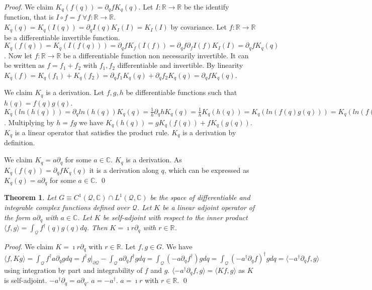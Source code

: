 \documentclass[smallextended]{svjour3}
\numberwithin{equation}{section}
\renewenvironment{proof}{\emph{Proof}.}{\hfill\(\qed\)}
\newtheorem{thrm}[equation]{Theorem}
\theoremstyle{definition}
\renewenvironment{proof}{\emph{Proof}.}{\qed}
\begin{document}
\begin{proof}
	We claim $K_q(f(q))= \partial_q f K_q(q)$. Let $I : \mathbb{R} \rightarrow \mathbb{R}$ be the identify function, that is $I \circ f = f \; \forall f : \mathbb{R} \rightarrow \mathbb{R}$. $K_q(q) = K_q(I(q)) = \partial_q I(q) K_{I}(I) = K_{I}(I)$ by covariance.
	Let $f : \mathbb{R} \rightarrow \mathbb{R}$ be a differentiable invertible function. $K_q(f(q)) =K_q(I(f(q))) = \partial_q f K_{f}(I(f)) = \partial_q f \partial_f I(f) K_{I}(I) = \partial_q f K_q(q)$. Now let $f : \mathbb{R} \rightarrow \mathbb{R}$ be a differentiable function non necessarily invertible. It can be written as $f = f_1 + f_2$ with $f_1, f_2$ differentiable and invertible. By linearity $K_q(f)=K_q(f_1) + K_q(f_2) = \partial_q f_1 K_q(q) + \partial_q f_2 K_q(q)  = \partial_q f K_q(q)$.
	
	We claim $K_q$ is a derivation. Let $f,g,h$ be differentiable functions such that $h(q)=f(q)g(q)$. $K_q(ln(h(q)))=\partial_q ln(h(q)) K_q(q) = \frac{1}{h} \partial_q h K_q(q) = \frac{1}{h} K_q(h(q)) = K_q(ln(f(q)g(q))) = K_q(ln(f(q))) + K_q(ln(g(q))) = \frac{1}{f} K_q(f(q)) + \frac{1}{g} K_q(g(q))$. Multiplying by $h=fg$ we have $K_q(h(q)) = g K_q(f(q)) + f K_q(g(q))$. $K_q$ is a linear operator that satisfies the product rule. $K_q$ is a derivation by definition.
	
	We claim $K_q = a \partial_q$ for some $a \in \mathbb{C}$. $K_q$ is a derivation. As $K_q(f(q))= \partial_q f K_q(q)$ it is a derivation along $q$, which can be expressed as $K_q(q)=a \partial_q$ for some $a \in \mathbb{C}$.
\end{proof}

\begin{thrm}\label{thrm:antihermitian_derivative}
	Let $G \equiv C^1(\mathcal{Q}, \mathbb{C}) \cap L^1(\mathcal{Q}, \mathbb{C})$ be the space of differentiable and integrable complex functions defined over $\mathcal{Q}$. Let $K$ be a linear adjoint operator of the form $a \partial_q$ with $a \in \mathbb{C}$. Let $K$ be self-adjoint with respect to the inner product $\langle f, g \rangle = 
	\int_{\mathcal{Q}} f^\dagger(q) g(q) dq$. Then $K= \imath r \partial_q$ with $r \in \mathbb{R}$.
\end{thrm}

\begin{proof}
	We claim $K= \imath r \partial_q$ with $r \in \mathbb{R}$. Let $f,g \in G$. We have $\langle f, K g \rangle = \int_{\mathcal{Q}}f^\dagger a \partial_q g dq = f^\dagger g |_{\partial \mathcal{Q}}  - \int_{\mathcal{Q}} a \partial_qf^\dagger  g dq= \int_{\mathcal{Q}} (- a\partial_q f^\dagger) g dq = \int_{\mathcal{Q}} (- a^\dagger\partial_q f)^\dagger g dq = \langle - a^\dagger\partial_q f, g \rangle$ using integration by part and integrability of $f$ and $g$. $\langle - a^\dagger\partial_q f, g \rangle =\langle K f, g \rangle$ as $K$ is self-adjoint. $- a^\dagger\partial_q = a \partial_q$. $a = - a^\dagger$. $a = \imath r$ with $r \in \mathbb{R}$.
\end{proof}
\end{document}
